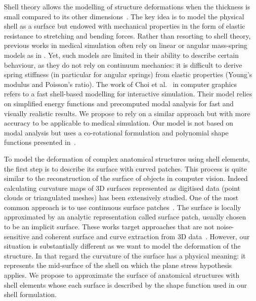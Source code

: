 \documentclass{llncs}
\begin{document}
Shell theory allows the modelling of structure deformations when the thickness is small compared to its other dimensions~\cite{Liu03}. The key idea is to model the physical shell as a surface but endowed with mechanical properties in the form of elastic resistance to stretching and bending forces. Rather than resorting to shell theory, previous works in medical simulation often rely on linear or angular mass-spring models as in \cite{Nedel98,Hammer08}. Yet, such models are limited in their ability to describe certain behaviour, as they do not rely on continuum mechanics: it is difficult to derive spring stiffness (in particular for angular springs) from elastic properties (Young's modulus and Poisson's ratio).
The work of Choi et al.~\cite{Choi07} in computer graphics refers to a fast shell-based modelling for interactive simulation. Their model relies on simplified energy functions and precomputed modal analysis for fast and visually realistic results. We propose to rely on a similar approach but with more accuracy to be applicable to medical simulation. Our model is not based on modal analysis but uses a co-rotational formulation and polynomial shape functions presented in~\cite{Comas10}. 

To model the deformation of complex anatomical structures using shell elements, the first step is to describe its surface with curved patches. This process is quite similar to the reconstruction of the surface of objects in computer vision. Indeed calculating curvature maps of 3D surfaces represented as digitised data (point clouds or triangulated meshes) has been extensively studied. One of the most common approach is to use continuous surface patches~\cite{Kolb95}. The surface is locally approximated by an analytic representation called surface patch, usually chosen to be an implicit surface. These works target approaches that are not noise-sensitive and coherent surface and curve extraction from 3D data~\cite{Tang99}. 
However, our situation is substantially different as we want to model the deformation of the structure. In that regard the curvature of the surface has a physical meaning: it represents the mid-surface of the shell on which the plane stress hypothesis~\cite{Liu03} applies. We propose to approximate the surface of anatomical structures with shell elements whose each surface is described by the shape function used in our shell formulation.
\end{document}
